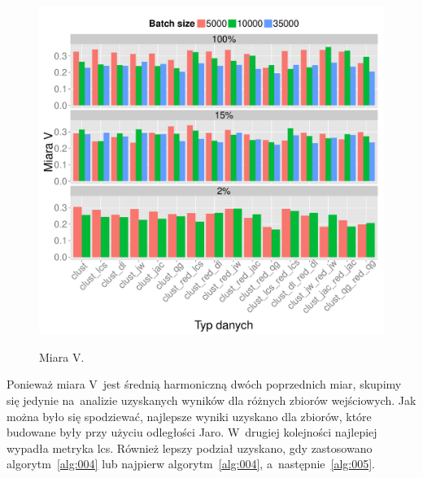 \documentclass{praca1}
\begin{document}

\begin{figure}[!h]
  \centering
  \includegraphics[width=400pt]{plot12.pdf}\\
  \caption{Miara V.}\label{plot:007}
\end{figure}

Ponieważ miara V~jest średnią harmoniczną dwóch poprzednich miar, skupimy się jedynie na~analizie uzyskanych wyników dla różnych zbiorów wejściowych. Jak można było się spodziewać, najlepsze wyniki uzyskano dla zbiorów, które budowane były przy użyciu odległości Jaro. W~drugiej kolejności najlepiej wypadła metryka lcs. Również lepszy podział uzyskano, gdy zastosowano algorytm~\ref{alg:004} lub najpierw algorytm~\ref{alg:004}, a~następnie~\ref{alg:005}. 
\end{document}

